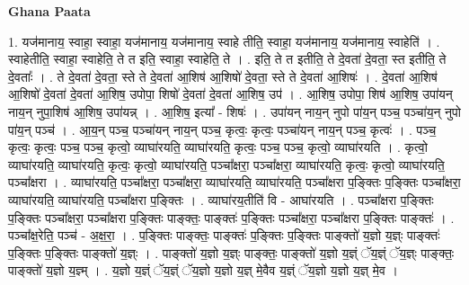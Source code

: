 \documentclass[17pt]{extarticle}
\begin{document}
\textbf{Ghana Paata } \newline

1. यज॑मानाय॒ स्वाहा॒ स्वाहा॒ यज॑मानाय॒ यज॑मानाय॒ स्वाहे तीति॒ स्वाहा॒ यज॑मानाय॒ यज॑मानाय॒ स्वाहेति॑ । . स्वाहेतीति॒ स्वाहा॒ स्वाहेति॒ ते त इति॒ स्वाहा॒ स्वाहेति॒ ते । . इति॒ ते त इतीति॒ ते दे॒वता॑ दे॒वता॒ स्त इतीति॒ ते दे॒वताः᳚ । . ते दे॒वता॑ दे॒वता॒ स्ते ते दे॒वता॑ आ॒शिष॑ आ॒शिषो॑ दे॒वता॒ स्ते ते दे॒वता॑ आ॒शिषः॑ । . दे॒वता॑ आ॒शिष॑ आ॒शिषो॑ दे॒वता॑ दे॒वता॑ आ॒शिष॒ उपोपा॒ शिषो॑ दे॒वता॑ दे॒वता॑ आ॒शिष॒ उप॑ । . आ॒शिष॒ उपोपा॒ शिष॑ आ॒शिष॒ उपा॑यन् नाय॒न् नुपा॒शिष॑ आ॒शिष॒ उपा॑यन्न् । . आ॒शिष॒ इत्या᳚ - शिषः॑ । . उपा॑यन् नाय॒न् नुपो पा॑य॒न् पञ्च॒ पञ्चा॑य॒न् नुपो पा॑य॒न् पञ्च॑ । . आ॒य॒न् पञ्च॒ पञ्चा॑यन् नाय॒न् पञ्च॒ कृत्वः॒ कृत्वः॒ पञ्चा॑यन् नाय॒न् पञ्च॒ कृत्वः॑ । . पञ्च॒ कृत्वः॒ कृत्वः॒ पञ्च॒ पञ्च॒ कृत्वो॒ व्याघा॑रयति॒ व्याघा॑रयति॒ कृत्वः॒ पञ्च॒ पञ्च॒ कृत्वो॒ व्याघा॑रयति । . कृत्वो॒ व्याघा॑रयति॒ व्याघा॑रयति॒ कृत्वः॒ कृत्वो॒ व्याघा॑रयति॒ पञ्चा᳚क्षरा॒ पञ्चा᳚क्षरा॒ व्याघा॑रयति॒ कृत्वः॒ कृत्वो॒ व्याघा॑रयति॒ पञ्चा᳚क्षरा । . व्याघा॑रयति॒ पञ्चा᳚क्षरा॒ पञ्चा᳚क्षरा॒ व्याघा॑रयति॒ व्याघा॑रयति॒ पञ्चा᳚क्षरा प॒ङ्क्तिः प॒ङ्क्तिः पञ्चा᳚क्षरा॒ व्याघा॑रयति॒ व्याघा॑रयति॒ पञ्चा᳚क्षरा प॒ङ्क्तिः । . व्याघा॑रय॒तीति॑ वि - आघा॑रयति । . पञ्चा᳚क्षरा प॒ङ्क्तिः प॒ङ्क्तिः पञ्चा᳚क्षरा॒ पञ्चा᳚क्षरा प॒ङ्क्तिः पाङ्क्तः॒ पाङ्क्तः॑ प॒ङ्क्तिः पञ्चा᳚क्षरा॒ पञ्चा᳚क्षरा प॒ङ्क्तिः पाङ्क्तः॑ । . पञ्चा᳚क्ष॒रेति॒ पञ्च॑ - अ॒क्ष॒रा॒ । . प॒ङ्क्तिः पाङ्क्तः॒ पाङ्क्तः॑ प॒ङ्क्तिः प॒ङ्क्तिः पाङ्क्तो॑ य॒ज्ञो य॒ज्ञ्ः पाङ्क्तः॑ प॒ङ्क्तिः प॒ङ्क्तिः पाङ्क्तो॑ य॒ज्ञ्ः । . पाङ्क्तो॑ य॒ज्ञो य॒ज्ञ्ः पाङ्क्तः॒ पाङ्क्तो॑ य॒ज्ञो य॒ज्ञ्ं ॅय॒ज्ञ्ं ॅय॒ज्ञ्ः पाङ्क्तः॒ पाङ्क्तो॑ य॒ज्ञो य॒ज्ञ्म् । . य॒ज्ञो य॒ज्ञ्ं ॅय॒ज्ञ्ं ॅय॒ज्ञो य॒ज्ञो य॒ज्ञ् मे॒वैव य॒ज्ञ्ं ॅय॒ज्ञो य॒ज्ञो य॒ज्ञ् मे॒व । \newline
\end{document}
